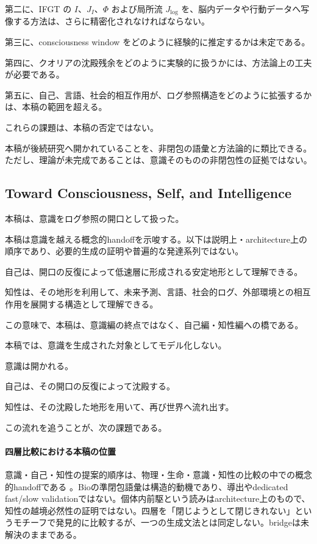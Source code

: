 第二に、IFGT の $I$、$J_I$、$\Phi$ および局所流 $J_{\log}$ を、脳内データや行動データへ写像する方法は、さらに精密化されなければならない。

第三に、consciousness window をどのように経験的に推定するかは未定である。

第四に、クオリアの沈殿残余をどのように実験的に扱うかには、方法論上の工夫が必要である。

第五に、自己、言語、社会的相互作用が、ログ参照構造をどのように拡張するかは、本稿の範囲を超える。

これらの課題は、本稿の否定ではない。

本稿が後続研究へ開かれていることを、非閉包の語彙と方法論的に類比できる。ただし、理論が未完成であることは、意識そのものの非閉包性の証拠ではない。

\subsection{Toward Consciousness, Self, and Intelligence}

本稿は、意識をログ参照の開口として扱った。

本稿は意識を越える概念的handoffを示唆する。以下は説明上・architecture上の順序であり、必要的生成の証明や普遍的な発達系列ではない。

自己は、開口の反復によって低速層に形成される安定地形として理解できる。

知性は、その地形を利用して、未来予測、言語、社会的ログ、外部環境との相互作用を展開する構造として理解できる。

この意味で、本稿は、意識編の終点ではなく、自己編・知性編への橋である。

本稿では、意識を生成された対象としてモデル化しない。

意識は開かれる。

自己は、その開口の反復によって沈殿する。

知性は、その沈殿した地形を用いて、再び世界へ流れ出す。

この流れを追うことが、次の課題である。

\paragraph{四層比較における本稿の位置}
意識・自己・知性の提案的順序は、物理・生命・意識・知性の比較の中での概念的handoffである \cite{Intelligence}。Bioの準閉包語彙は構造的動機であり、導出やdedicated fast/slow validationではない。個体内前駆という読みはarchitecture上のもので、知性の越境必然性の証明ではない。四層を「閉じようとして閉じきれない」というモチーフで発見的に比較するが、一つの生成文法とは同定しない。bridgeは未解決のままである。

